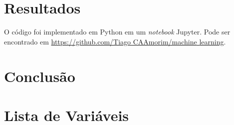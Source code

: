 \documentclass[final,5p]{elsarticle}
\numberwithin{equation}{section}
\begin{document}
\section{Resultados}


        O código foi implementado em Python em um \emph{notebook} Jupyter. Pode ser encontrado em \href{https://github.com/TiagoCAAmorim/machine_learning/blob/main/Lista01/Lista01.ipynb}{https://github.com/Tiago CAAmorim/machine\underline{ }learning}.

\section{Conclusão}




\appendix

\section{Lista de Variáveis}
\end{document}
